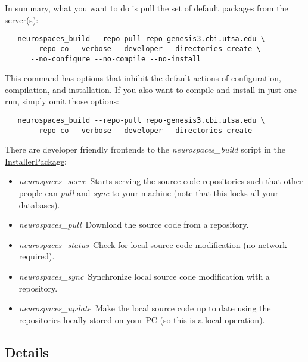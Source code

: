 \documentclass[12pt]{article}
\begin{document}
In summary, what you want to do is pull the set of default packages from the server(s):
\begin{verbatim}
   neurospaces_build --repo-pull repo-genesis3.cbi.utsa.edu \
      --repo-co --verbose --developer --directories-create \
      --no-configure --no-compile --no-install
\end{verbatim}
This command has options that inhibit the default actions of configuration, compilation, and installation. If you also want to compile and install in just one run, simply omit those options:
\begin{verbatim}
   neurospaces_build --repo-pull repo-genesis3.cbi.utsa.edu \
      --repo-co --verbose --developer --directories-create
\end{verbatim}
There are developer friendly frontends to the {\it neurospaces\_build} script in the \href{../installerpackage/installerpackage.tex}{InstallerPackage}:
\begin{itemize}
\item {\it neurospaces\_serve}\,\,\,Starts serving the source code repositories such that other people can {\it pull} and {\it sync} to your machine (note that this locks all your databases).
\item {\it neurospaces\_pull}\,\,\,Download the source code from a repository.
\item {\it neurospaces\_status}\,\,\,Check for local source code modification (no network required).
\item {\it neurospaces\_sync}\,\,\,Synchronize local source code modification with a repository.
\item {\it neurospaces\_update}\,\,\,Make the local source code up to date using the repositories locally stored on your PC (so this is a local operation). 
\end{itemize}

\subsection*{Details}
\end{document}

